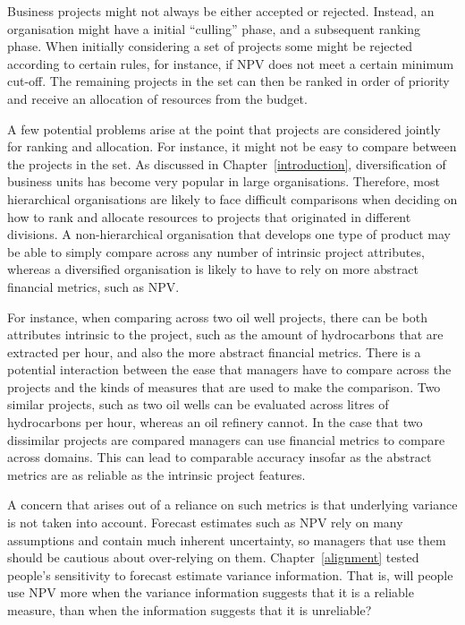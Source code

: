 \documentclass[a4paper, nobind, dvipsnames]{templates/ociamthesis}
\theoremstyle{definition}
\theoremstyle{definition}
\theoremstyle{definition}
\theoremstyle{definition}
\theoremstyle{remark}
\begin{document}
Business projects might not always be either accepted or rejected. Instead, an
organisation might have a initial ``culling'' phase, and a subsequent ranking
phase. When initially considering a set of projects some might be rejected
according to certain rules, for instance, if NPV does not meet a certain minimum
cut-off. The remaining projects in the set can then be ranked in order of
priority and receive an allocation of resources from the budget.

A few potential problems arise at the point that projects are considered jointly
for ranking and allocation. For instance, it might not be easy to compare
between the projects in the set. As discussed in Chapter~\ref{introduction},
diversification of business units has become very popular in large
organisations. Therefore, most hierarchical organisations are likely to face
difficult comparisons when deciding on how to rank and allocate resources to
projects that originated in different divisions. A non-hierarchical organisation
that develops one type of product may be able to simply compare across any
number of intrinsic project attributes, whereas a diversified organisation is
likely to have to rely on more abstract financial metrics, such as NPV.

For instance, when comparing across two oil well projects, there can be both
attributes intrinsic to the project, such as the amount of hydrocarbons that are
extracted per hour, and also the more abstract financial metrics. There is a
potential interaction between the ease that managers have to compare across the
projects and the kinds of measures that are used to make the comparison. Two
similar projects, such as two oil wells can be evaluated across litres of
hydrocarbons per hour, whereas an oil refinery cannot. In the case that two
dissimilar projects are compared managers can use financial metrics to compare
across domains. This can lead to comparable accuracy insofar as the abstract
metrics are as reliable as the intrinsic project features.

A concern that arises out of a reliance on such metrics is that underlying
variance is not taken into account. Forecast estimates such as NPV rely on many
assumptions and contain much inherent uncertainty, so managers that use them
should be cautious about over-relying on them. Chapter~\ref{alignment} tested
people's sensitivity to forecast estimate variance information. That is, will
people use NPV more when the variance information suggests that it is a reliable
measure, than when the information suggests that it is unreliable?
\end{document}

